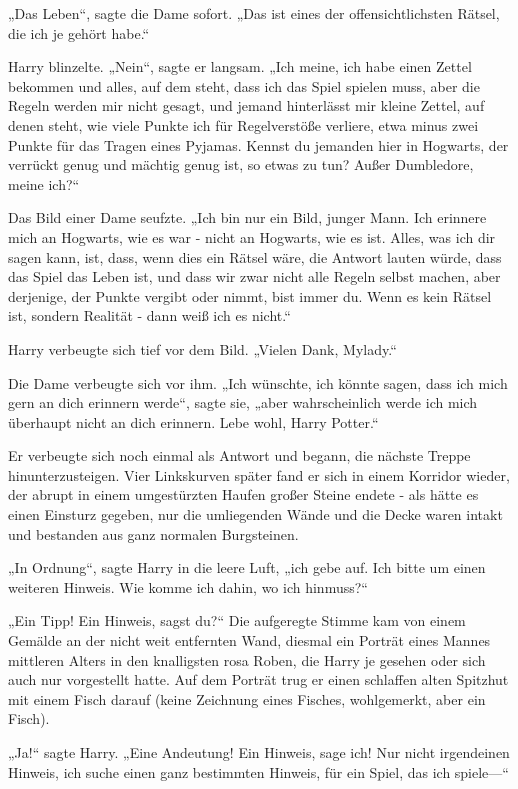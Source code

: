 {„Das Leben“, sagte die Dame sofort. „Das ist eines der offensichtlichsten Rätsel, die ich je gehört habe.“

Harry blinzelte. „Nein“, sagte er langsam. „Ich meine, ich habe einen Zettel bekommen und alles, auf dem steht, dass ich das Spiel spielen muss, aber die Regeln werden mir nicht gesagt, und jemand hinterlässt mir kleine Zettel, auf denen steht, wie viele Punkte ich für Regelverstöße verliere, etwa minus zwei Punkte für das Tragen eines Pyjamas. Kennst du jemanden hier in Hogwarts, der verrückt genug und mächtig genug ist, so etwas zu tun? Außer Dumbledore, meine ich?“

Das Bild einer Dame seufzte. „Ich bin nur ein Bild, junger Mann. Ich erinnere mich an Hogwarts, wie es war - nicht an Hogwarts, wie es ist. Alles, was ich dir sagen kann, ist, dass, wenn dies ein Rätsel wäre, die Antwort lauten würde, dass das Spiel das Leben ist, und dass wir zwar nicht alle Regeln selbst machen, aber derjenige, der Punkte vergibt oder nimmt, bist immer du. Wenn es kein Rätsel ist, sondern Realität - dann weiß ich es nicht.“

Harry verbeugte sich tief vor dem Bild. „Vielen Dank, Mylady.“

Die Dame verbeugte sich vor ihm. „Ich wünschte, ich könnte sagen, dass ich mich gern an dich erinnern werde“, sagte sie, „aber wahrscheinlich werde ich mich überhaupt nicht an dich erinnern. Lebe wohl, Harry Potter.“

Er verbeugte sich noch einmal als Antwort und begann, die nächste Treppe hinunterzusteigen. Vier Linkskurven später fand er sich in einem Korridor wieder, der abrupt in einem umgestürzten Haufen großer Steine endete - als hätte es einen Einsturz gegeben, nur die umliegenden Wände und die Decke waren intakt und bestanden aus ganz normalen Burgsteinen.

„In Ordnung“, sagte Harry in die leere Luft, „ich gebe auf. Ich bitte um einen weiteren Hinweis. Wie komme ich dahin, wo ich hinmuss?“

„Ein Tipp! Ein Hinweis, sagst du?“ Die aufgeregte Stimme kam von einem Gemälde an der nicht weit entfernten Wand, diesmal ein Porträt eines Mannes mittleren Alters in den knalligsten rosa Roben, die Harry je gesehen oder sich auch nur vorgestellt hatte. Auf dem Porträt trug er einen schlaffen alten Spitzhut mit einem Fisch darauf (keine Zeichnung eines Fisches, wohlgemerkt, aber ein Fisch).

„Ja!“ sagte Harry. „Eine Andeutung! Ein Hinweis, sage ich! Nur nicht irgendeinen Hinweis, ich suche einen ganz bestimmten Hinweis, für ein Spiel, das ich spiele—“

}
